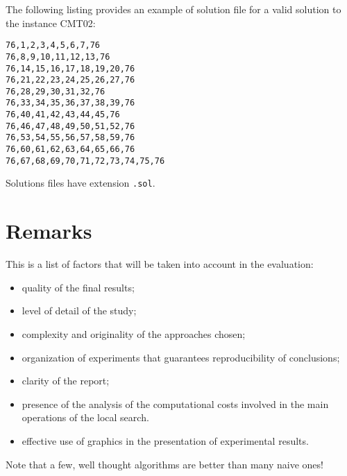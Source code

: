 The following listing provides an example of solution file for a valid
solution to the instance CMT02:

\begin{lstlisting}
76,1,2,3,4,5,6,7,76
76,8,9,10,11,12,13,76
76,14,15,16,17,18,19,20,76
76,21,22,23,24,25,26,27,76
76,28,29,30,31,32,76
76,33,34,35,36,37,38,39,76
76,40,41,42,43,44,45,76
76,46,47,48,49,50,51,52,76
76,53,54,55,56,57,58,59,76
76,60,61,62,63,64,65,66,76
76,67,68,69,70,71,72,73,74,75,76 
\end{lstlisting}

Solutions files have extension \verb!.sol!.



\section*{Remarks}

\begin{remarks} 


\item This is a list of factors that will be taken into account in the
evaluation:


\begin{itemize} 
\item quality of the final results;
\item level of detail of the study;
\item complexity and originality of the approaches chosen;

\item organization of experiments that guarantees reproducibility of
  conclusions;
\item clarity of the report;
\item presence of the analysis of the computational costs involved in
  the main operations of the local search.

\item effective use of graphics in the presentation of experimental results.
\end{itemize}


\item 
Note that a few, well thought algorithms are better than many naive ones!

\end{remarks}



